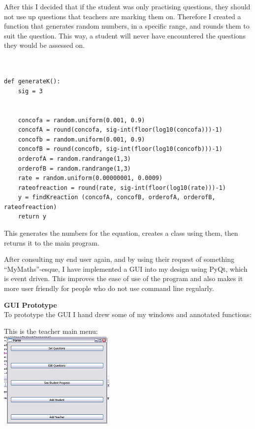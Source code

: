 \documentclass[a4paper,12pt]{report}
\begin{document}
After this I decided that if the student was only practising questions, they should not use up questions that teachers are marking them on. Therefore I created a function that generates random numbers, in a specific range, and rounds them to suit the question. This way, a student will never have encountered the questions they would be assessed on.

\begin{verbatim}


def generateK():
    sig = 3
    
    
    concofa = random.uniform(0.001, 0.9)
    concofA = round(concofa, sig-int(floor(log10(concofa)))-1)
    concofb = random.uniform(0.001, 0.9)
    concofB = round(concofb, sig-int(floor(log10(concofb)))-1)
    orderofA = random.randrange(1,3)
    orderofB = random.randrange(1,3)
    rate = random.uniform(0.00000001, 0.0009)
    rateofreaction = round(rate, sig-int(floor(log10(rate)))-1)
    y = findKreaction (concofA, concofB, orderofA, orderofB, rateofreaction)
    return y
\end{verbatim}
\begin{flushleft}

This generates the numbers for the equation, creates a class using them, then returns it to the main program.





After consulting my end user again, and by using their request of something “MyMaths”-esque, I have implemented a GUI into my design using PyQt, which is event driven. This improves the ease of use of the program and also makes it more user friendly for people who do not use command line regularly.

\textbf{GUI Prototype}\\
To prototype the GUI I hand drew some of my windows and annotated functions:
\end{flushleft}
This is the teacher main menu:\\
\includegraphics{MainMenuOld}\label{Old Main Menu}
\end{document}
